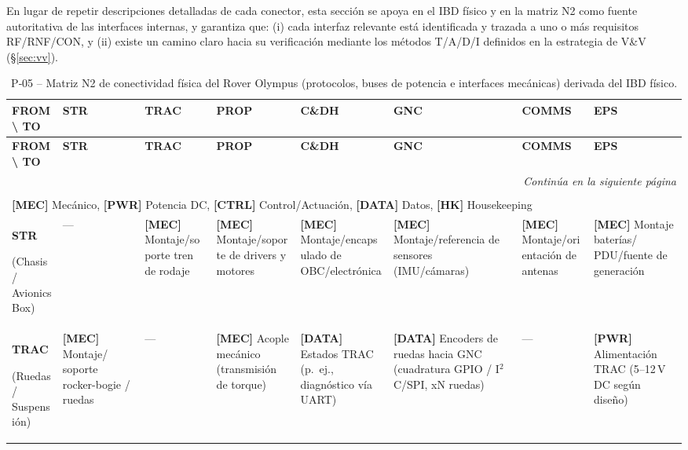 En lugar de repetir descripciones detalladas de cada conector, esta sección se apoya en el IBD físico y en la matriz N2 como fuente autoritativa de las interfaces internas, y garantiza que:
(i) cada interfaz relevante está identificada y trazada a uno o más requisitos RF/RNF/CON, y
(ii) existe un camino claro hacia su verificación mediante los métodos T/A/D/I definidos en la estrategia de V\&V (\S\ref{sec:vv}).

\begin{landscape}
\scriptsize
\renewcommand{\arraystretch}{1.2}
\setlength{\tabcolsep}{2pt}

\begin{longtable}{|p{2.3cm}||p{2.9cm}|p{2.9cm}|p{2.9cm}|p{2.9cm}|p{2.9cm}|p{2.9cm}|p{2.9cm}|}
\caption{P‑05 – Matriz N2 de conectividad física del Rover Olympus (protocolos, buses de potencia e interfaces mecánicas) derivada del IBD físico.}\label{tab:n2_fisica}\\
\hline
\textbf{FROM \textbackslash{} TO} & \textbf{STR} & \textbf{TRAC} & \textbf{PROP} & \textbf{C\&DH} & \textbf{GNC} & \textbf{COMMS} & \textbf{EPS} \\ \hline
\hline
\endfirsthead

\hline
\textbf{FROM \textbackslash{} TO} & \textbf{STR} & \textbf{TRAC} & \textbf{PROP} & \textbf{C\&DH} & \textbf{GNC} & \textbf{COMMS} & \textbf{EPS} \\ \hline
\hline
\endhead

\hline
\multicolumn{8}{r}{\textit{Continúa en la siguiente página}}\\
\endfoot

\hline
\multicolumn{8}{l}{\textbf{Leyenda de tipos de interfaz:}} \\
\multicolumn{8}{l}{\textbf{[MEC]} Mecánico, \textbf{[PWR]} Potencia DC, \textbf{[CTRL]} Control/Actuación, \textbf{[DATA]} Datos, \textbf{[HK]} Housekeeping} \\
\endlastfoot

\textbf{STR}\par(Chasis / Avionics Box) & --- & \textbf{[MEC]} Montaje/soporte tren de rodaje & \textbf{[MEC]} Montaje/soporte de drivers y motores & \textbf{[MEC]} Montaje/encapsulado de OBC/electrónica & \textbf{[MEC]} Montaje/referencia de sensores (IMU/cámaras) & \textbf{[MEC]} Montaje/orientación de antenas & \textbf{[MEC]} Montaje baterías/ PDU/fuente de generación \\ \hline

\textbf{TRAC}\par(Ruedas / Suspensión) & \textbf{[MEC]} Montaje/ soporte rocker-bogie / ruedas & --- & \textbf{[MEC]} Acople mecánico (transmisión de torque) & \textbf{[DATA]} Estados TRAC (p.\ ej., diagnóstico vía UART) & \textbf{[DATA]} Encoders de ruedas hacia GNC (cuadratura GPIO / I$^2$C/SPI, xN ruedas) & --- & \textbf{[PWR]} Alimentación TRAC (5--12\,V DC según diseño) \\ \hline


\end{longtable}
\end{landscape}
